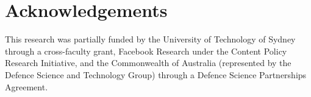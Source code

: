 \section*{Acknowledgements}
This research was partially funded by the University of Technology of Sydney through a cross-faculty grant, Facebook Research under the Content Policy Research Initiative, and the Commonwealth of Australia (represented by the Defence Science and Technology Group) through a Defence Science Partnerships Agreement.